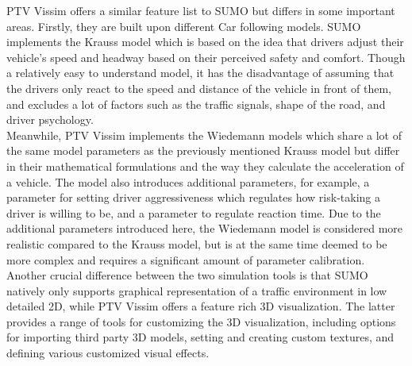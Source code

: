 PTV Vissim offers a similar feature list to SUMO but differs in some important areas. Firstly, they are built upon different Car following models. SUMO implements the Krauss model which is based on the idea that drivers adjust their vehicle’s speed and headway based on their perceived safety and comfort. Though a relatively easy to understand model, it has the disadvantage of assuming that the drivers only react to the speed and distance of the vehicle in front of them, and excludes a lot of factors such as the traffic signals, shape of the road, and driver psychology. \\

Meanwhile, PTV Vissim implements the Wiedemann models which share a lot of the same model parameters as the previously mentioned Krauss model but differ in their mathematical formulations and the way they calculate the acceleration of a vehicle. The model also introduces additional parameters, for example, a parameter for setting driver aggressiveness which regulates how risk-taking a driver is willing to be, and a parameter to regulate reaction time. Due to the additional parameters introduced here, the Wiedemann model is considered more realistic compared to the Krauss model, but is at the same time deemed to be more complex and requires a significant amount of parameter calibration. \\

Another crucial difference between the two simulation tools is that SUMO natively only supports graphical representation of a traffic environment in low detailed 2D, while PTV Vissim offers a feature rich 3D visualization. The latter provides a range of tools for customizing the 3D visualization, including options for importing third party 3D models, setting and creating custom textures, and defining various customized visual effects. 
